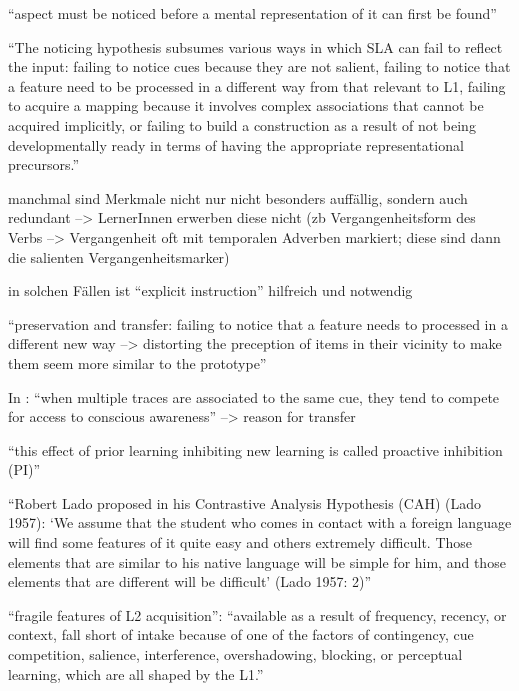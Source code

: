         ``aspect must be noticed before a mental representation of it can first be found''

        ``The noticing hypothesis subsumes various ways in which SLA can fail to reflect the input: failing to notice cues because they are not salient, failing to notice that a feature need to be processed in a different way from that relevant to L1, failing to acquire a mapping because it involves complex associations that cannot be acquired implicitly, or failing to build a construction as a result of not being developmentally ready in terms of having the appropriate representational precursors.''

        manchmal sind Merkmale nicht nur nicht besonders auffällig, sondern auch redundant --> LernerInnen erwerben diese nicht (zb Vergangenheitsform des Verbs --> Vergangenheit oft mit temporalen Adverben markiert; diese sind dann die salienten Vergangenheitsmarker)

        in solchen Fällen ist ``explicit instruction'' hilfreich und notwendig

        ``preservation and transfer: failing to notice that a feature needs to processed in a different new way --> distorting the preception of items in their vicinity to make them seem more similar to the prototype''

In \cite{Ellis06}: ``when multiple
traces are associated to the same cue, they tend to compete for access to
conscious awareness'' --> reason for transfer

``this effect of prior learning inhibiting
new learning is called proactive inhibition (PI)''

``Robert Lado proposed in his
Contrastive Analysis Hypothesis (CAH) (Lado 1957): ‘We assume that the
student who comes in contact with a foreign language will find some features
of it quite easy and others extremely difficult. Those elements that are similar
to his native language will be simple for him, and those elements that
are different will be difficult’ (Lado 1957: 2)''


        ``fragile features of L2 acquisition'': ``available as a
        result of frequency, recency, or context, fall short of intake because of one of the
        factors of contingency, cue competition, salience, interference, overshadowing,
        blocking, or perceptual learning, which are all shaped by the L1.''




